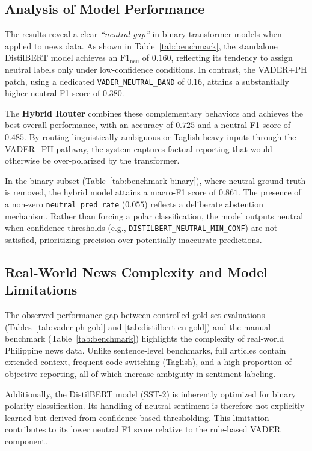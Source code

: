 \documentclass[sigconf, nonacm]{acmart}
\begin{document}
\subsection{Analysis of Model Performance}

The results reveal a clear \emph{``neutral gap''} in binary transformer models when applied to news data. As shown in Table~\ref{tab:benchmark}, the standalone DistilBERT model achieves an $\mathrm{F1}_{\mathrm{neu}}$ of $0.160$, reflecting its tendency to assign neutral labels only under low-confidence conditions. In contrast, the VADER+PH patch, using a dedicated \texttt{VADER\_NEUTRAL\_BAND} of $0.16$, attains a substantially higher neutral F1 score of $0.380$.

The \textbf{Hybrid Router} combines these complementary behaviors and achieves the best overall performance, with an accuracy of $0.725$ and a neutral F1 score of $0.485$. By routing linguistically ambiguous or Taglish-heavy inputs through the VADER+PH pathway, the system captures factual reporting that would otherwise be over-polarized by the transformer.

In the binary subset (Table~\ref{tab:benchmark-binary}), where neutral ground truth is removed, the hybrid model attains a macro-F1 score of \textbf{$0.861$}. The presence of a non-zero \texttt{neutral\_pred\_rate} ($0.055$) reflects a deliberate abstention mechanism. Rather than forcing a polar classification, the model outputs neutral when confidence thresholds (e.g., \texttt{DISTILBERT\_NEUTRAL\_MIN\_CONF}) are not satisfied, prioritizing precision over potentially inaccurate predictions.

\subsection{Real-World News Complexity and Model Limitations}

The observed performance gap between controlled gold-set evaluations (Tables~\ref{tab:vader-ph-gold} and \ref{tab:distilbert-en-gold}) and the manual benchmark (Table~\ref{tab:benchmark}) highlights the complexity of real-world Philippine news data. Unlike sentence-level benchmarks, full articles contain extended context, frequent code-switching (Taglish), and a high proportion of objective reporting, all of which increase ambiguity in sentiment labeling.

Additionally, the DistilBERT model (SST-2) is inherently optimized for binary polarity classification. Its handling of neutral sentiment is therefore not explicitly learned but derived from confidence-based thresholding. This limitation contributes to its lower neutral F1 score relative to the rule-based VADER component.
\end{document}
